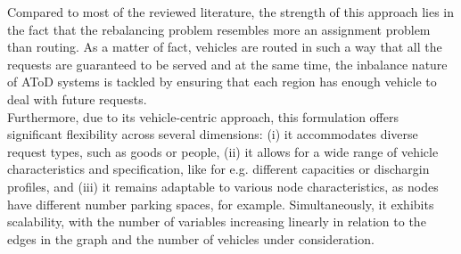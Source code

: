 Compared to most of the reviewed literature, the strength of this approach lies in the fact that the rebalancing problem resembles more an assignment problem than routing. As a matter of fact, vehicles are routed in such a way that all the requests are guaranteed to be served and at the same time, the inbalance nature of AToD systems is tackled by ensuring that each region has enough vehicle to deal with future requests. \\
Furthermore, due to its vehicle-centric approach, this formulation offers significant flexibility across several dimensions: (i) it accommodates diverse request types, such as goods or people, (ii) it allows for a wide range of vehicle characteristics and specification, like for e.g. different capacities or dischargin profiles, and (iii) it remains adaptable to various node characteristics, as nodes have different number parking spaces, for example. Simultaneously, it exhibits scalability, with the number of variables increasing linearly in relation to the edges in the graph and the number of vehicles under consideration.
%
%
%


